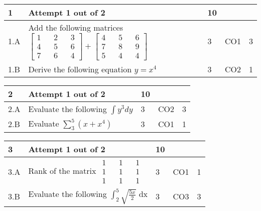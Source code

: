 \documentclass[12pt]{article}
\begin{document}
	\begin{tabular}{|L{1cm}|L{8cm}|C{1cm}|C{1cm}|C{1cm}|}\hline
			\bf1 & \bf{Attempt} \bf1 out of \bf2 & \bf10 & & \\ \hline
				1.A &
	Add the following matrices $\begin{bmatrix} 1 && 2 && 3\\ 4 && 5 && 6\\ 7 && 6 && 4 \end{bmatrix}+\begin{bmatrix} 4 && 5 && 6\\ 7 && 8 && 9 \\ 5 && 4 && 4 \end{bmatrix}$ \newline
		 &  3 & CO1 & 3\\ \hline
		1.B &
	Derive the following equation $y=x^{4}$ \newline
		 &  3 & CO2 & 1\\ \hline
		\end{tabular}

	
	


	
	
		

	
	
	\begin{tabular}{|L{1cm}|L{8cm}|C{1cm}|C{1cm}|C{1cm}|}\hline
			\bf2 & \bf{Attempt} \bf1 out of \bf2 & \bf10 & & \\ \hline
				2.A &
	Evaluate the following $\int y^{3} dy$ \newline
		 &  3 & CO2 & 3\\ \hline
		2.B &
	Evaluate $\displaystyle \sum_{3}^{5}(x+x^{4})$ \newline
		 &  3 & CO1 & 1\\ \hline
		\end{tabular}

	
	


	
	
		

	
	
	\begin{tabular}{|L{1cm}|L{8cm}|C{1cm}|C{1cm}|C{1cm}|}\hline
			\bf3 & \bf{Attempt} \bf1 out of \bf2 & \bf10 & & \\ \hline
				3.A &
	Rank of the matrix  $\begin{matrix} 1 && 1 &&1 \\ 1 && 1 && 1\\ 1 && 1 && 1 \end{matrix}$ \newline
		 &  3 & CO1 & 1\\ \hline
		3.B &
	Evaluate the following $\int_{2}^{5}\sqrt{\frac{5x}{2}}$ dx \newline
		 &  3 & CO3 & 3\\ \hline
		\end{tabular}

	
	


	
	
		
	
\end{document}
